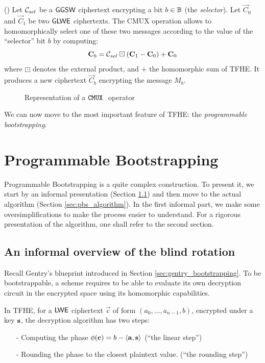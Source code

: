 \begin{definition}(\CMUX)
	Let $\mathcal C_{sel}$ be a $\textsf{GGSW}$ ciphertext encrypting a bit $b \in \mathbb{B}$ (the \textit{selector}). Let $\vec C_0$ and $\vec C_1$ be two $\textsf{GLWE}$ ciphertexts. The CMUX operation allows to homomorphically select one of these two messages according to the value of the ``selector'' bit $b$ by computing:
	\begin{equation*}
		\mathbf C_b = \mathcal C_{sel} \boxdot (\mathbf C_1 - \mathbf C_0) + \mathbf C_0
	\end{equation*}
	where $\boxdot$ denotes the external product, and $+$ the homomorphic sum of TFHE. It produces a new ciphertext $\vec C_b$ encrypting the message $M_b$.
\end{definition}


\begin{figure}
	\centering
	\singleCmux
	\caption{Representation of a $\texttt{CMUX}~$ operator}
	\label{fig:cmux}
\end{figure}


We can now move to the most important feature of TFHE: the \textit{programmable bootstrapping}.

\section{Programmable Bootstrapping}
\label{sec:pbs}

Programmable Bootstrapping is a quite complex construction. To present it, we start by an informal presentation (Section \ref{sec:overview_blind_rotation}) and then move to the actual algorithm (Section \ref{sec:pbs_algorithm}). In the first informal part, we make some oversimplifications to make the process easier to understand. For a rigorous presentation of the algorithm, one shall refer to the second section.

\subsection{An informal overview of the blind rotation}
\label{sec:overview_blind_rotation}

Recall Gentry's blueprint introduced in Section \ref{sec:gentry_bootstrapping}. To be bootstrappable, a scheme requires to be able to evaluate its own decryption circuit in the encrypted space using its homomorphic capabilities.

In TFHE, for a $\textsf{LWE}$ ciphertext $\vec c$ of form $(a_0, \dots, a_{n-1}, b)$, encrypted under a key $\mathbf s$, the decryption algorithm has two steps:
\begin{itemize}
	\item[-] Computing the phase $\phi(\mathbf c) = b - \left \langle \mathbf a, \mathbf s \right \rangle$ (``the linear step'')
	\item[-] Rounding the phase to the closest plaintext value. (``the rounding step'')
\end{itemize}

